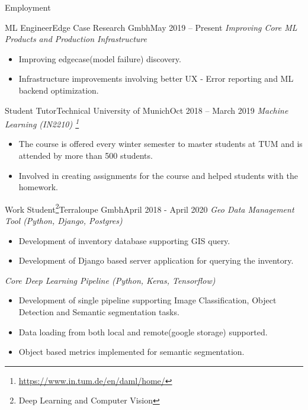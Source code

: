 \documentclass[]{mcdowellcv}
\begin{document}
    \begin{cvsection}{Employment}

            \begin{cvsubsection}{ML Engineer}{Edge Case Research Gmbh}{May 2019 -- Present}
        \textit{Improving Core ML Products and Production Infrastructure}
            \begin{itemize}
                \item Improving edgecase(model failure) discovery.
                \item Infrastructure improvements involving better UX - Error reporting and ML backend optimization.
            \end{itemize}
        \end{cvsubsection}
    
            \begin{cvsubsection}{Student Tutor}{Technical University of Munich}{Oct 2018 -- March 2019}    
        \textit{Machine Learning (IN2210) \footnote{\href{https://www.in.tum.de/en/daml/home/}{https://www.in.tum.de/en/daml/home/}}}
            \begin{itemize}
                \item The course is offered every winter semester to master students at TUM and is attended by more than 500 students. 
                \item Involved in creating assignments for the course and helped students with the homework. 
            \end{itemize}
        \end{cvsubsection}
    
        \begin{cvsubsection}{Work Student\footnote{Deep Learning and Computer Vision\label{ws}}}{Terraloupe Gmbh}{April 2018 - April 2020}
            \textit{Geo Data Management Tool (Python, Django, Postgres)}
            \begin{itemize}
                \item Development of inventory database supporting GIS query.
                \item Development of Django based server application for querying the inventory.
            \end{itemize}
                
            \textit{Core Deep Learning Pipeline (Python, Keras, Tensorflow)}
            \begin{itemize}
                \item Development of single pipeline supporting Image Classification, Object Detection and Semantic segmentation tasks.
                \item Data loading from both local and remote(google storage) supported.
                \item Object based metrics implemented for semantic segmentation.
            \end{itemize}
            

\end{cvsubsection}
\end{cvsection}
\end{document}
